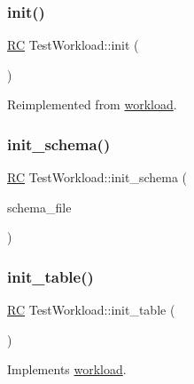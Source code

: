 \subsubsection{\texorpdfstring{init()}{init()}}
{\footnotesize\ttfamily \hyperlink{global_8h_a78c49a674c810fdd03d20432f7be864a}{RC} Test\+Workload\+::init (\begin{DoxyParamCaption}{ }\end{DoxyParamCaption})\hspace{0.3cm}{\ttfamily [virtual]}}



Reimplemented from \hyperlink{classworkload_a7cef7a7101c78e10082c99356e77a57c}{workload}.

\mbox{\label{classTestWorkload_af93fb571938ef9fcd18fc5e3cd402849}} 
\subsubsection{\texorpdfstring{init\+\_\+schema()}{init\_schema()}}
{\footnotesize\ttfamily \hyperlink{global_8h_a78c49a674c810fdd03d20432f7be864a}{RC} Test\+Workload\+::init\+\_\+schema (\begin{DoxyParamCaption}\item[{const char $\ast$}]{schema\+\_\+file }\end{DoxyParamCaption})}

\mbox{\label{classTestWorkload_a4963c5307360dc96391779393a1571dc}} 
\subsubsection{\texorpdfstring{init\+\_\+table()}{init\_table()}}
{\footnotesize\ttfamily \hyperlink{global_8h_a78c49a674c810fdd03d20432f7be864a}{RC} Test\+Workload\+::init\+\_\+table (\begin{DoxyParamCaption}{ }\end{DoxyParamCaption})\hspace{0.3cm}{\ttfamily [virtual]}}



Implements \hyperlink{classworkload_a3feee79af04069f6c1ad6b7f9b0a045a}{workload}.

